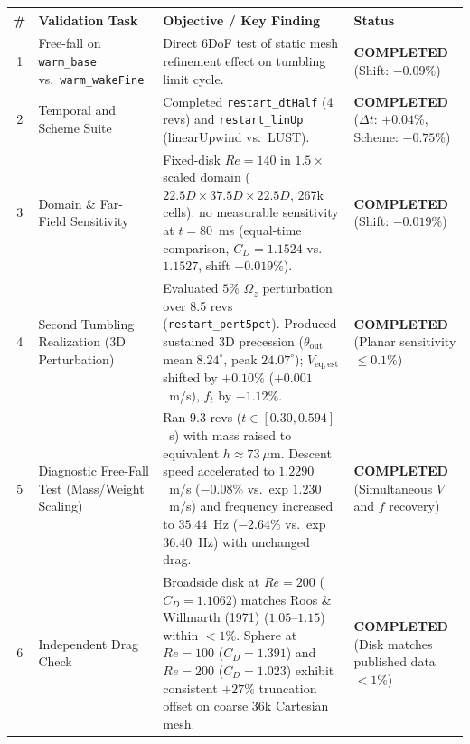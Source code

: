 \documentclass[11pt,a4paper]{article}
\begin{document}
\begin{table}[H]
\centering
\small
\begin{tabularx}{\textwidth}{c >{\raggedright\arraybackslash}p{42mm} >{\raggedright\arraybackslash}X >{\centering\arraybackslash}p{32mm}}
\toprule
\textbf{\#} & \textbf{Validation Task} & \textbf{Objective / Key Finding} & \textbf{Status} \\
\midrule
1 & Free-fall on \texttt{warm\_base} vs.\ \texttt{warm\_wakeFine} & Direct 6DoF test of static mesh refinement effect on tumbling limit cycle. & \textbf{COMPLETED} \newline (Shift: $-0.09\%$) \\
2 & Temporal and Scheme Suite & Completed \texttt{restart\_dtHalf} (4 revs) and \texttt{restart\_linUp} (linearUpwind vs.\ LUST). & \textbf{COMPLETED} \newline ($\Delta t$: $+0.04\%$, Scheme: $-0.75\%$) \\
3 & Domain \& Far-Field Sensitivity & Fixed-disk $Re = 140$ in $1.5\times$ scaled domain ($22.5D \times 37.5D \times 22.5D$, 267k cells): no measurable sensitivity at $t = 80$~ms (equal-time comparison, $C_D = 1.1524$ vs.\ $1.1527$, shift $-0.019\%$). & \textbf{COMPLETED} \newline (Shift: $-0.019\%$) \\
4 & Second Tumbling Realization (3D Perturbation) & Evaluated $5\%$ $\Omega_z$ perturbation over 8.5 revs (\texttt{restart\_pert5pct}). Produced sustained 3D precession ($\theta_{\mathrm{out}}$ mean $8.24^\circ$, peak $24.07^\circ$); $V_{\mathrm{eq,est}}$ shifted by $+0.10\%$ ($+0.001$~m/s), $f_t$ by $-1.12\%$. & \textbf{COMPLETED} \newline (Planar sensitivity $\le 0.1\%$) \\
5 & Diagnostic Free-Fall Test (Mass/Weight Scaling) & Ran 9.3 revs ($t \in [0.30, 0.594]$~s) with mass raised to equivalent $h \approx 73\ \mu$m. Descent speed accelerated to $1.2290$~m/s ($-0.08\%$ vs.\ exp $1.230$~m/s) and frequency increased to $35.44$~Hz ($-2.64\%$ vs.\ exp $36.40$~Hz) with unchanged drag. & \textbf{COMPLETED} \newline (Simultaneous $V$ and $f$ recovery) \\
6 & Independent Drag Check & Broadside disk at $Re = 200$ ($C_D = 1.1062$) matches Roos \& Willmarth (1971) ($1.05\text{--}1.15$) within $< 1\%$. Sphere at $Re = 100$ ($C_D = 1.391$) and $Re = 200$ ($C_D = 1.023$) exhibit consistent $+27\%$ truncation offset on coarse 36k Cartesian mesh. & \textbf{COMPLETED} \newline (Disk matches published data $< 1\%$) \\

\end{tabularx}
\end{table}
\end{document}
